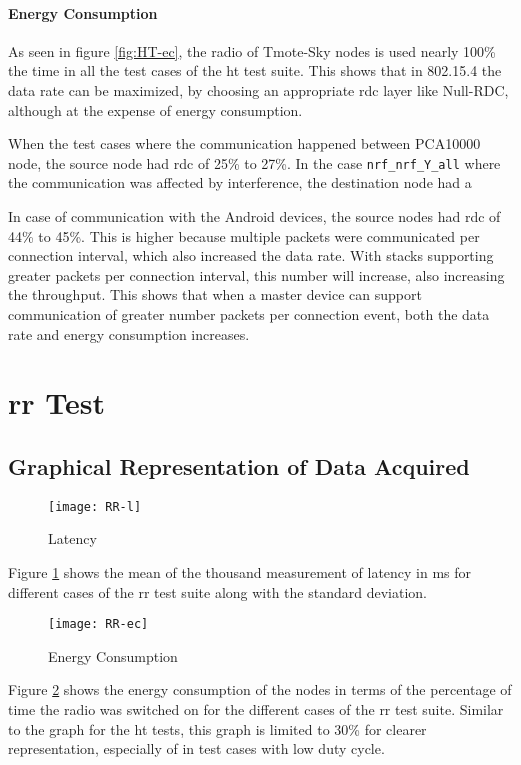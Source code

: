 \paragraph{Energy Consumption}
As seen in figure \ref{fig:HT-ec}, the radio of Tmote-Sky nodes is used nearly 100\% the time in all the test cases of the \gls{ht} test suite. This shows that in 802.15.4 the data rate can be maximized, by choosing an appropriate \gls{rdc} layer like Null-RDC, although at the expense of energy consumption. 

When the test cases where the communication happened between PCA10000 node, the source node had \gls{rdc} of 25\% to 27\%. In the case \texttt{nrf\_nrf\_Y\_all} where the communication was affected by interference, the destination node had a 

In case of communication with the Android devices, the source nodes had \gls{rdc} of 44\% to 45\%. This is higher because multiple packets were communicated per connection interval, which also increased the data rate. With stacks supporting greater packets per connection interval, this number will increase, also increasing the throughput. This shows that when a master device can support communication of greater number packets per connection event, both the data rate and energy consumption increases.

\section{\acrlong{rr} Test}

\subsection{Graphical Representation of Data Acquired}
\begin{figure}[h]
\texttt{[image: RR-l]}
\caption{Latency}
\label{fig:RR-l}
\end{figure}

Figure \ref{fig:RR-l} shows the mean of the thousand measurement of latency in ms for different cases of the \gls{rr} test suite along with the standard deviation. 

\begin{figure}[h]
\texttt{[image: RR-ec]}
\caption{Energy Consumption}
\label{fig:RR-ec}
\end{figure}

Figure \ref{fig:RR-ec} shows the energy consumption of the nodes in terms of the percentage of time the radio was switched on for the different cases of the \gls{rr} test suite. Similar to the graph for the \gls{ht} tests, this graph is limited to 30\% for clearer representation, especially of in test cases with low duty cycle.


